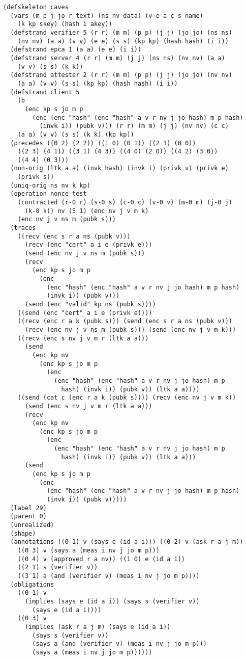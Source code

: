\documentclass[titlepage,12pt]{article}
\theoremstyle{definition}
\begin{document}
\begin{verbatim}
(defskeleton caves
  (vars (m p j jo r text) (ns nv data) (v e a c s name)
    (k kp skey) (hash i akey))
  (defstrand verifier 5 (r r) (m m) (p p) (j j) (jo jo) (ns ns)
    (nv nv) (a a) (v v) (e e) (s s) (kp kp) (hash hash) (i i))
  (defstrand epca 1 (a a) (e e) (i i))
  (defstrand server 4 (r r) (m m) (j j) (ns ns) (nv nv) (a a)
    (v v) (s s) (k k))
  (defstrand attester 2 (r r) (m m) (p p) (j j) (jo jo) (nv nv)
    (a a) (v v) (s s) (kp kp) (hash hash) (i i))
  (defstrand client 5
    (b
      (enc kp s jo m p
        (enc (enc "hash" (enc "hash" a v r nv j jo hash) m p hash)
          (invk i)) (pubk v))) (r r) (m m) (j j) (nv nv) (c c)
    (a a) (v v) (s s) (k k) (kp kp))
  (precedes ((0 2) (2 2)) ((1 0) (0 1)) ((2 1) (0 0))
    ((2 3) (4 1)) ((3 1) (4 3)) ((4 0) (2 0)) ((4 2) (3 0))
    ((4 4) (0 3)))
  (non-orig (ltk a a) (invk hash) (invk i) (privk v) (privk e)
    (privk s))
  (uniq-orig ns nv k kp)
  (operation nonce-test
    (contracted (r-0 r) (s-0 s) (c-0 c) (v-0 v) (m-0 m) (j-0 j)
      (k-0 k)) nv (5 1) (enc nv j v m k)
    (enc nv j v ns m (pubk s)))
  (traces
    ((recv (enc s r a ns (pubk v)))
      (recv (enc "cert" a i e (privk e)))
      (send (enc nv j v ns m (pubk s)))
      (recv
        (enc kp s jo m p
          (enc
            (enc "hash" (enc "hash" a v r nv j jo hash) m p hash)
            (invk i)) (pubk v)))
      (send (enc "valid" kp ns (pubk s))))
    ((send (enc "cert" a i e (privk e))))
    ((recv (enc r a k (pubk s))) (send (enc s r a ns (pubk v)))
      (recv (enc nv j v ns m (pubk s))) (send (enc nv j v m k)))
    ((recv (enc s nv j v m r (ltk a a)))
      (send
        (enc kp nv
          (enc kp s jo m p
            (enc
              (enc "hash" (enc "hash" a v r nv j jo hash) m p
                hash) (invk i)) (pubk v)) (ltk a a))))
    ((send (cat c (enc r a k (pubk s)))) (recv (enc nv j v m k))
      (send (enc s nv j v m r (ltk a a)))
      (recv
        (enc kp nv
          (enc kp s jo m p
            (enc
              (enc "hash" (enc "hash" a v r nv j jo hash) m p
                hash) (invk i)) (pubk v)) (ltk a a)))
      (send
        (enc kp s jo m p
          (enc
            (enc "hash" (enc "hash" a v r nv j jo hash) m p hash)
            (invk i)) (pubk v)))))
  (label 29)
  (parent 0)
  (unrealized)
  (shape)
  (annotations ((0 1) v (says e (id a i))) ((0 2) v (ask r a j m))
    ((0 3) v (says a (meas i nv j jo m p)))
    ((0 4) v (approved r a nv)) ((1 0) e (id a i))
    ((2 1) s (verifier v))
    ((3 1) a (and (verifier v) (meas i nv j jo m p))))
  (obligations
    ((0 1) v
      (implies (says e (id a i)) (says s (verifier v))
        (says e (id a i))))
    ((0 3) v
      (implies (ask r a j m) (says e (id a i))
        (says s (verifier v))
        (says a (and (verifier v) (meas i nv j jo m p)))
        (says a (meas i nv j jo m p))))))
\end{verbatim}
\end{document}
